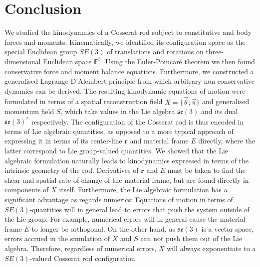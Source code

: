 \section{Conclusion}

We studied the kinodynamics of a Cosserat rod subject to constitutive and body forces and moments. Kinematically, we identified its configuration space as the special Euclidean group $SE(3)$ of translations and rotations on three-dimensional Euclidean space $\mathbb{E}^3$. Using the Euler-Poincaré theorem we then found conservative force and moment balance equations. Furthermore, we constructed a generalised Lagrange-D'Alembert principle from which arbitrary non-conservative dynamics can be derived. The resulting kinodynamic equations of motion were formulated in terms of a spatial reconstruction field $X = \{ \vec{\theta} ; \vec{\pi} \}$ and generalised momentum field $S$, which take values in the Lie algebra $\mathfrak{se}(3)$ and its dual $\mathfrak{se}(3)^*$ respectively. The configuration of the Cosserat rod is thus encoded in terms of Lie algebraic quantities, as opposed to a more typical approach of expressing it in terms of its center-line $\mathbf{r}$ and material frame $E$ directly, where the latter correspond to Lie group-valued quantities. We showed that the Lie algebraic formulation naturally leads to kinodynamics expressed in terms of the intrinsic geometry of the rod. Derivatives of $\mathbf{r}$ and $E$ must be taken to find the shear and spatial rate-of-change of the material frame, but are found directly in components of $X$ itself. Furthermore, the Lie algebraic formulation has a significant advantage as regards  numerics: Equations of motion in terms of $SE(3)$-quantities will in general lead to errors that push the system outside of the Lie group. For example, numerical errors will in general cause the material frame $E$ to longer be orthogonal. On the other hand, as $\mathfrak{se}(3)$ is a vector space, errors accrued in the simulation of $X$ and $S$ can not push them out of the Lie algebra. Therefore, regardless of numerical errors, $X$ will always exponentiate to a $SE(3)$-valued Cosserat rod configuration.


